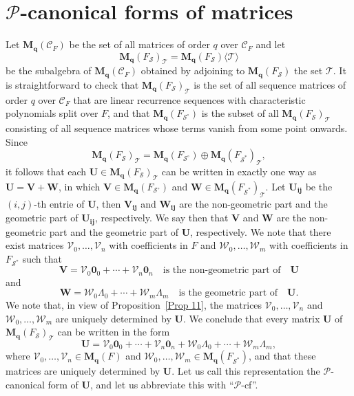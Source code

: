 \documentclass[12pt]{amsart}
\theoremstyle{definition}
\numberwithin{equation}{section}
\numberwithin{equation}{section}
\begin{document}
\section{$\mathcal{P}$-canonical forms of matrices}
\label{sect:canonical forms of matrices}
Let $\mathbf{M_{q}}(\mathcal{C}_{F})$ be the set of all matrices of order $q$ over $\mathcal{C}_{F}$ and let $$\mathbf{M_{q}}(F_{\mathcal{S}})_{\mathcal{T}}=\mathbf{M_{q}}(F_{\mathcal{S}})\langle\mathcal{T}\rangle$$ be the subalgebra of $\mathbf{M_{q}}(\mathcal{C}_{F})$ obtained by adjoining to $\mathbf{M_{q}}(F_{\mathcal{S}})$ the set $\mathcal{T}$. It is straightforward to check that $\mathbf{M_{q}}(F_{\mathcal{S}})_{\mathcal{T}}$ is the set of all sequence matrices of order $q$ over $\mathcal{C}_{F}$ that are linear recurrence sequences with characteristic polynomials split over $F$, and that $\mathbf{M_{q}}(F_{\mathcal{S}^{\circ}})$ is the subset of all $\mathbf{M_{q}}(F_{\mathcal{S}})_{\mathcal{T}}$ consisting of all sequence matrices whose terms vanish from some point onwards. Since $$\mathbf{M_{q}}(F_{\mathcal{S}})_{\mathcal{T}}=
\mathbf{M_{q}}(F_{\mathcal{S}^{\circ}})\oplus\mathbf{M_{q}}(F_{\mathcal{S}^{\ast}})_{\mathcal{T}},$$ it follows that each $\pmb{U}\in \mathbf{M_{q}}(F_{\mathcal{S}})_{\mathcal{T}}$ can be written in exactly one way as $\pmb{U}=\pmb{V}+\pmb{W}$, in which $\pmb{V}\in \mathbf{M_{q}}(F_{\mathcal{S}^{\circ}})$ and $\pmb{W}\in \mathbf{M_{q}}(F_{\mathcal{S}^{\ast}})_{\mathcal{T}}$. Let $\pmb{U_{ij}}$ be the $(i, j)$-th entrie of $\pmb{U}$, then $\pmb{V_{ij}}$ and $\pmb{W_{ij}}$ are the non-geometric part and the geometric part of $\pmb{U_{ij}}$, respectively. We say then that $\pmb{V}$ and $\pmb{W}$ are the non-geometric part and the geometric part of $\pmb{U}$, respectively. We note that there exist matrices $\mathcal{V}_{0},\ldots, \mathcal{V}_{n}$ with coefficients in $F$ and $\mathcal{W}_{0},\ldots, \mathcal{W}_{m}$ with coefficients in $F_{\mathcal{S}^{\ast}}$ such that
$$\pmb{V}=\mathcal{V}_{0}\pmb{0}_{0}+\cdots+\mathcal{V}_{n}\pmb{0}_{n}\quad\text{is the non-geometric part of}\quad \pmb{U}$$
and
$$\pmb{W}=\mathcal{W}_{0}\Lambda_{0}+\cdots+\mathcal{W}_{m}\Lambda_{m}\quad\text{is the geometric part of}\quad \pmb{U}.$$
We note that, in view of Proposition~\ref{Prop 11}, the matrices $\mathcal{V}_{0},\ldots, \mathcal{V}_{n}$ and $\mathcal{W}_{0},\ldots, \mathcal{W}_{m}$ are uniquely determined by $\pmb{U}$. We conclude that every matrix $\pmb{U}$ of $\mathbf{M_{q}}(F_{\mathcal{S}})_{\mathcal{T}}$ can be written in the form $$\pmb{U}=\mathcal{V}_{0}\pmb{0}_{0}+\cdots+\mathcal{V}_{n}\pmb{0}_{n}+\mathcal{W}_{0}\Lambda_{0}+
\cdots+\mathcal{W}_{m}\Lambda_{m},$$ where $\mathcal{V}_{0},\ldots, \mathcal{V}_{n}\in \mathbf{M_{q}}(F)$ and $\mathcal{W}_{0},\ldots, \mathcal{W}_{m}\in \mathbf{M_{q}}(F_{\mathcal{S}^{\ast}})$, and that these matrices are uniquely determined by $\pmb{U}$. Let us call this representation the $\mathcal{P}$-canonical form of $\pmb{U}$, and let us abbreviate this with \enquote{$\mathcal{P}$-cf}.
\end{document}
